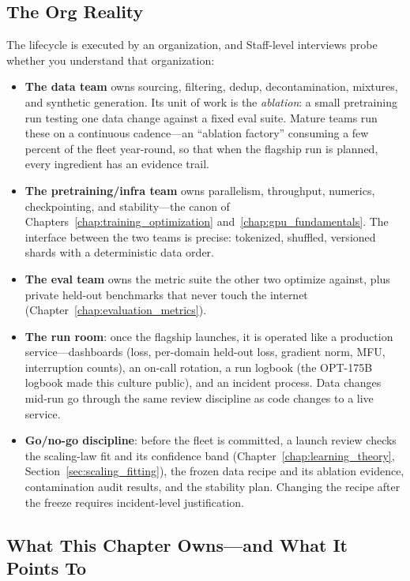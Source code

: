 \subsection{The Org Reality}

The lifecycle is executed by an organization, and Staff-level interviews probe whether you understand that organization:

\begin{itemize}
    \item \textbf{The data team} owns sourcing, filtering, dedup, decontamination, mixtures, and synthetic generation. Its unit of work is the \textit{ablation}: a small pretraining run testing one data change against a fixed eval suite. Mature teams run these on a continuous cadence---an ``ablation factory'' consuming a few percent of the fleet year-round, so that when the flagship run is planned, every ingredient has an evidence trail.
    \item \textbf{The pretraining/infra team} owns parallelism, throughput, numerics, checkpointing, and stability---the canon of Chapters~\ref{chap:training_optimization} and~\ref{chap:gpu_fundamentals}. The interface between the two teams is precise: tokenized, shuffled, versioned shards with a deterministic data order.
    \item \textbf{The eval team} owns the metric suite the other two optimize against, plus private held-out benchmarks that never touch the internet (Chapter~\ref{chap:evaluation_metrics}).
    \item \textbf{The run room}: once the flagship launches, it is operated like a production service---dashboards (loss, per-domain held-out loss, gradient norm, MFU, interruption counts), an on-call rotation, a run logbook (the OPT-175B logbook made this culture public), and an incident process. Data changes mid-run go through the same review discipline as code changes to a live service.
    \item \textbf{Go/no-go discipline}: before the fleet is committed, a launch review checks the scaling-law fit and its confidence band (Chapter~\ref{chap:learning_theory}, Section~\ref{sec:scaling_fitting}), the frozen data recipe and its ablation evidence, contamination audit results, and the stability plan. Changing the recipe after the freeze requires incident-level justification.
\end{itemize}

\subsection{What This Chapter Owns---and What It Points To}

